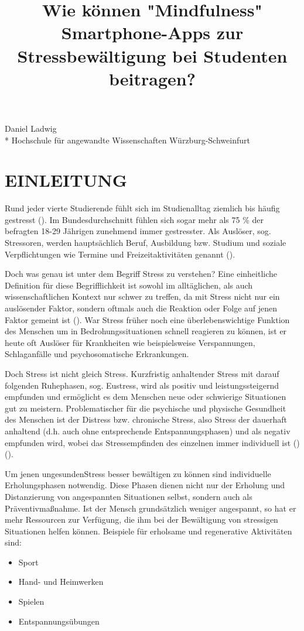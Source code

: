 \documentclass[10pt]{article}
\title{Wie können "Mindfulness" Smartphone-Apps zur Stressbewältigung bei Studenten beitragen? }
\makeatletter
\renewcommand{\maketitle}{\bgroup\setlength{\parindent}{0pt}
\begin{flushleft}
  \Large{\textbf{\@title}}
\end{flushleft}\egroup
}
\newcommand{\zit}[1]{(\cite{#1})}
\makeatother
\begin{document}
\maketitle

\begin{flushleft}
Daniel Ladwig \\* 
Hochschule für angewandte Wissenschaften Würzburg-Schweinfurt
\end{flushleft}



\section{EINLEITUNG}

Rund jeder vierte Studierende fühlt sich im Studienalltag ziemlich bis häufig gestresst \zit{gesundheitStudis2017}. Im Bundesdurchschnitt fühlen sich sogar mehr als 75 \% der befragten 18-29 Jährigen zunehmend immer gestresster. Als Auslöser, sog. Stressoren, werden hauptsächlich Beruf, Ausbildung bzw. Studium und soziale Verpflichtungen wie Termine und Freizeitaktivitäten genannt \zit{tkEntspannDich2016}. 

Doch was genau ist unter dem Begriff Stress zu verstehen? Eine einheitliche Definition für diese Begrifflichkeit ist sowohl im alltäglichen, als auch wissenschaftlichen Kontext nur schwer zu treffen, da mit Stress nicht nur ein auslösender Faktor, sondern oftmals auch die Reaktion oder Folge auf jenen Faktor gemeint ist \zit{StressAllgemein}. War Stress früher noch eine überlebenswichtige Funktion des Menschen um in Bedrohungssituationen schnell reagieren zu können, ist er heute oft Auslöser für Krankheiten wie beispielsweise Verspannungen, Schlaganfälle und psychosomatische Erkrankungen. 

Doch Stress ist nicht gleich Stress. Kurzfristig anhaltender Stress mit darauf folgenden Ruhephasen, sog. Eustress, wird als positiv und leistungssteigernd empfunden und ermöglicht es dem Menschen neue oder schwierige Situationen gut zu meistern. 
Problematischer für die psychische und physische Gesundheit des Menschen ist der Distress bzw. chronische Stress, also Stress der dauerhaft anhaltend (d.h. auch ohne entsprechende Entspannungsphasen) und als negativ empfunden wird, wobei das Stressempfinden des einzelnen immer individuell ist \zit{StressGrundwissen} \zit{ChronischerStress}. 

Um jenen \grqq ungesunden\grqq  Stress besser bewältigen zu können sind individuelle Erholungsphasen notwendig. Diese Phasen dienen nicht nur der Erholung  und Distanzierung von angespannten Situationen selbst, sondern auch als Präventivmaßnahme. Ist der Mensch grundsätzlich weniger angespannt, so hat er mehr Ressourcen zur Verfügung, die ihm bei der Bewältigung von stressigen Situationen helfen können. 
Beispiele für erholsame und regenerative Aktivitäten sind:
\begin{itemize}[itemsep=0.5mm, parsep=0pt]
\item  Sport
\item  Hand- und Heimwerken
\item  Spielen
\item Entspannungsübungen
\end{itemize}
\end{document}
